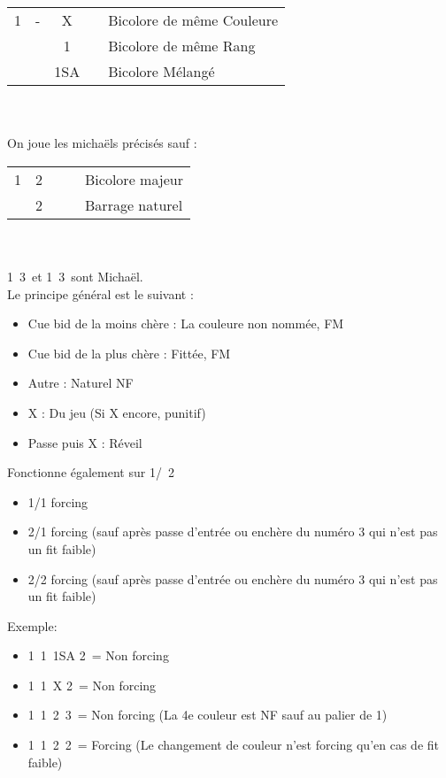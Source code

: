 \documentclass[a4paper, oneside, 11pt]{report}
\begin{document}
	\begin{tabular}{cccc|l}
	1\trefle & -  & X && Bicolore de même Couleure\\
	&& 1\carreau && Bicolore de même Rang\\
	&& 1SA && Bicolore Mélangé\\
	\end{tabular}\\\\

	On joue les michaëls précisés sauf :\\
		
	\begin{tabular}{cccc|l}
	1\trefle & 2\trefle &&& Bicolore majeur\\
	& 2\carreau &&& Barrage naturel\\
	\end{tabular}\\\\

	1\trefle\ 3\trefle\ et 1\carreau\ 3\trefle\ sont Michaël.\\

	Le principe général est le suivant :
	\begin{itemize}
	\item Cue bid de la moins chère : La couleure non nommée, FM
	\item Cue bid de la plus chère : Fittée, FM
	\item Autre : Naturel NF\\
	\item X : Du jeu (Si X encore, punitif)
	\item Passe puis X : Réveil\\
	\end{itemize}
	Fonctionne également sur 1\trefle/\carreau\ 2\carreau

	\begin{itemize}
	\item 1/1 forcing
	\item 2/1 forcing (sauf après passe d'entrée ou enchère du numéro 3 qui n'est pas un fit faible)
	\item 2/2 forcing (sauf après passe d'entrée ou enchère du numéro 3 qui n'est pas un fit faible)\\
	\end{itemize}
	
	Exemple:
	\begin{itemize}
	\item 1\trefle\ 1\pique\ 1SA 2\carreau\ = Non forcing
	\item 1\trefle\ 1\pique\ X 2\carreau\ = Non forcing
	\item 1\trefle\ 1\pique\ 2\coeur\ 3\carreau\ = Non forcing (La 4e couleur est NF sauf au palier de 1)
	\item 1\trefle\ 1\pique\ 2\trefle\ 2\carreau\ = Forcing (Le changement de couleur n'est forcing qu'en cas de fit faible)\\
	\end{itemize}
\end{document}
